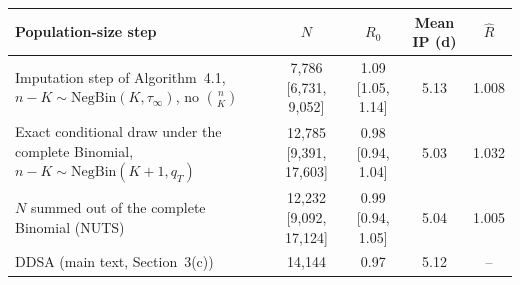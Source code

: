 \begin{tabular}{p{} c c c c}
\toprule
Population-size step & $N$ & $R_0$ & Mean IP (d) & $\hat R$ \\
\midrule
Imputation step of Algorithm~4.1, $n-K\sim\mathrm{NegBin}(K,\tau_\infty)$, no $\binom{n}{K}$ & 7{,}786 [6{,}731, 9{,}052] & 1.09 [1.05, 1.14] & 5.13 & 1.008 \\
Exact conditional draw under the complete Binomial, $n-K\sim\mathrm{NegBin}(K+1,q_T)$ & 12{,}785 [9{,}391, 17{,}603] & 0.98 [0.94, 1.04] & 5.03 & 1.032 \\
$N$ summed out of the complete Binomial (NUTS) & 12{,}232 [9{,}092, 17{,}124] & 0.99 [0.94, 1.05] & 5.04 & 1.005 \\
\addlinespace
DDSA (main text, Section~3(c)) & 14{,}144 & 0.97 & 5.12 & -- \\
\bottomrule
\end{tabular}
